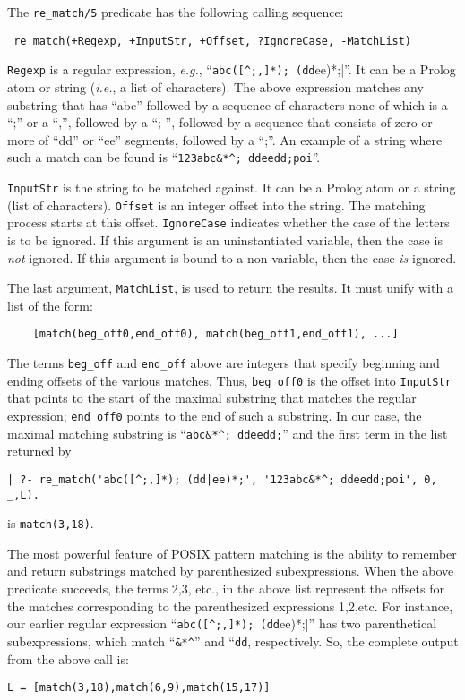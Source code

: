 The \verb|re_match/5| predicate has the following calling sequence:
\begin{verbatim}
 re_match(+Regexp, +InputStr, +Offset, ?IgnoreCase, -MatchList)
\end{verbatim}
{\tt Regexp} is a regular expression, {\it e.g.},
``\verb|abc([^;,]*); (dd|ee)*;|''. It can be a Prolog atom or string ({\it i.e.}, a list of
characters). The above expression matches any substring that has ``abc''
followed by a sequence of characters none of which is a ``;'' or a ``,'',
followed by a ``; '', followed by a sequence that consists of zero or more
of ``dd'' or ``ee'' segments, followed by a ``;''. An example of a string
where such a match can be found is ``\verb|123abc&*^; ddeedd;poi|''.

{\tt InputStr} is the string to be matched against. It can be a Prolog atom
or a string (list of characters). {\tt Offset} is an integer offset into
the string. The matching process starts at this offset. {\tt IgnoreCase}
indicates whether the case of the letters is to be ignored. If this
argument is an uninstantiated variable, then the case is \emph{not}
ignored. If this argument is bound to a non-variable, then the case
\emph{is} ignored.

The last argument, {\tt MatchList}, is used to return the results. It
must unify with a list of the form:
\begin{verbatim}
    [match(beg_off0,end_off0), match(beg_off1,end_off1), ...]  
\end{verbatim}
The terms {\tt beg\_off} and {\tt end\_off} above are integers that specify
beginning and ending offsets of the various matches. Thus, {\tt beg\_off0}
is the offset into {\tt InputStr} that points to the start of the maximal
substring that matches the regular expression; {\tt end\_off0} points to the
end of such a substring. In our case, the maximal matching substring is 
``\verb|abc&*^; ddeedd;|'' and the first term in the list returned by
\begin{verbatim}
| ?- re_match('abc([^;,]*); (dd|ee)*;', '123abc&*^; ddeedd;poi', 0, _,L).  
\end{verbatim}
is {\tt match(3,18)}.

The most powerful feature of POSIX pattern matching is the ability to
remember and return substrings matched by parenthesized subexpressions.
When the above predicate succeeds, the terms 2,3, etc., in the above list
represent the offsets for the matches corresponding to the parenthesized
expressions 1,2,etc.
For instance, our earlier regular expression 
  ``\verb|abc([^;,]*); (dd|ee)*;|'' has two parenthetical subexpressions, which
match ``\verb|&*^|'' and ``{\tt dd}, respectively. So, the complete output
from the above call is:
\begin{verbatim}
L = [match(3,18),match(6,9),match(15,17)]  
\end{verbatim}

